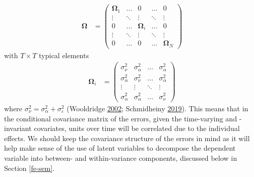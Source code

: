 \documentclass[
  12pt,
  a4paper]{article}
\begin{document}
\begin{align}
\bm{\Omega} & = 
\begin{pmatrix}
\bm{\Omega}_{1} & \hdots & 0 & \hdots & 0 \\
\vdots & \ddots & \vdots & \ddots & \vdots \\
0 & \hdots & \bm{\Omega}_{i} & \hdots & 0 \\
\vdots & \ddots & \vdots & \ddots & \vdots \\
0 & \hdots & 0 & \hdots & \bm{\Omega}_{N}
\end{pmatrix}
\end{align} with \(T \times T\) typical elements \begin{align}
\bm{\Omega}_{i} & = 
\begin{pmatrix}
\sigma^{2}_{\nu} & \sigma^{2}_{\alpha} & \hdots & \sigma^{2}_{\alpha} \\
\sigma^{2}_{\alpha} & \sigma^{2}_{\nu} & \hdots & \sigma^{2}_{\alpha} \\
\vdots & \vdots & \ddots & \vdots \\
\sigma^{2}_{\alpha} & \sigma^{2}_{\alpha} & \hdots & \sigma^{2}_{\nu}
\end{pmatrix} \label{eq:omeganui}
\end{align} where
\(\sigma^{2}_{\nu} = \sigma^{2}_{\alpha} + \sigma^{2}_{\varepsilon}\)
(Wooldridge \protect\hyperlink{ref-Wooldridge2002}{2002}; Schmidheiny
\protect\hyperlink{ref-Schmidheiny2019}{2019}). This means that in the
conditional covariance matrix of the errors, given the time-varying and
-invariant covariates, units over time will be correlated due to the
individual effects. We should keep the covariance structure of the
errors in mind as it will help make sense of the use of latent variables
to decompose the dependent variable into between- and within-variance
components, discussed below in Section \ref{fe-sem}.
\end{document}
